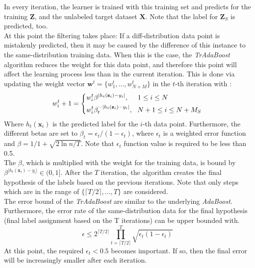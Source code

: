 In every iteration, the learner is trained with this training set and predicts for the training $\mathbf{Z}$, and the unlabeled target dataset $\mathbf{X}$.
Note that the label for $\mathbf{Z}_S$ is predicted, too.\cite{Dai.}\\
At this point the filtering takes place:
If a diff-distribution data point is mistakenly predicted, then it may be caused by the difference of this instance to the same-distribution training data.
When this is the case, the \textit{TrAdaBoost} algorithm reduces the weight for this data point, and therefore this point will affect the learning process less than in the current iteration.
This is done via updating the weight vector $\mathbf{w}^t=\{w_1^t,\dots,w_{N+M}^t\}$ in the $t$-th iteration with \cite{Dai.}:
\begin{equation}\label{EqTrAdaWeighting}
	w_i^t+1=\begin{dcases}
				w_i^t\beta^{\vert h_t(\mathbf{z}_i )-y_i\vert}, \>\>\>\>\>\> 1\le i \le N \\
				w_i^t\beta_t^{-\vert h_t(\mathbf{z}_i )-y_i\vert}, \>\>\> N+1\le i \le N+M_S
			 \end{dcases}
\end{equation}
Where $ h_t(\mathbf{x}_i )$ is the predicted label for the $i$-th data point.
Furthermore, the different betas are set to $\beta_t = \epsilon_t / (1-\epsilon_t)$, where $\epsilon_t$ is a weighted error function and $\beta= 1 / 1 + \sqrt{2\ln n/T}$.
Note that $\epsilon_t$ function value is required to be less than 0.5.\\
The $\beta$, which is multiplied with the weight for the training data, is bound by $\beta^{\vert h_t(\mathbf{x}_i )-y_i\vert} \in (0,1]$.
After the $T$ iteration, the algorithm creates the final hypothesis of the labels based on the previous iterations.
Note that only steps which are in the range of $\{\lceil T /2 \rceil,\dots,T\}$ are considered.\cite{Dai.}\\
The error bound of the \textit{TrAdaBoost} are similar to the underlying \textit{AdaBoost}.
Furthermore, the error rate of the same-distribution data for the final hypothesis (final label assignment based on the T iterations) can be upper bounded with.
\begin{equation}
	\epsilon \le 2^{\lceil T / 2\rceil} \prod_{t=\lceil T / 2\rceil}^{T} \sqrt{\epsilon_t(1-\epsilon_t)}
\end{equation}
At this point, the required $\epsilon_t < 0.5$ becomes important.
If so, then the final error will be increasingly smaller after each iteration.\cite{Dai.}

